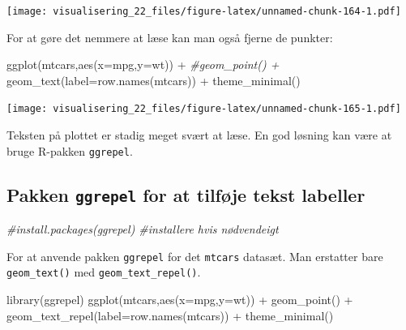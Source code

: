 \documentclass[
]{book}
\newenvironment{Shaded}{\begin{snugshade}}{\end{snugshade}}
\newcommand{\AttributeTok}[1]{\textcolor[rgb]{0.77,0.63,0.00}{#1}}
\newcommand{\CommentTok}[1]{\textcolor[rgb]{0.56,0.35,0.01}{\textit{#1}}}
\newcommand{\FunctionTok}[1]{\textcolor[rgb]{0.00,0.00,0.00}{#1}}
\newcommand{\NormalTok}[1]{#1}
\newcommand{\SpecialCharTok}[1]{\textcolor[rgb]{0.00,0.00,0.00}{#1}}
\begin{document}
\texttt{[image: visualisering\_22\_files/figure-latex/unnamed-chunk-164-1.pdf]}

For at gøre det nemmere at læse kan man også fjerne de punkter:

\begin{Shaded}
\begin{Highlighting}[]
\FunctionTok{ggplot}\NormalTok{(mtcars,}\FunctionTok{aes}\NormalTok{(}\AttributeTok{x=}\NormalTok{mpg,}\AttributeTok{y=}\NormalTok{wt)) }\SpecialCharTok{+} 
  \CommentTok{\#geom\_point() +}
  \FunctionTok{geom\_text}\NormalTok{(}\AttributeTok{label=}\FunctionTok{row.names}\NormalTok{(mtcars)) }\SpecialCharTok{+} 
  \FunctionTok{theme\_minimal}\NormalTok{()}
\end{Highlighting}
\end{Shaded}

\texttt{[image: visualisering\_22\_files/figure-latex/unnamed-chunk-165-1.pdf]}

Teksten på plottet er stadig meget svært at læse. En god løsning kan være at bruge R-pakken \texttt{ggrepel}.

\hypertarget{pakken-ggrepel-for-at-tilfuxf8je-tekst-labeller}{%
\subsection{\texorpdfstring{Pakken \texttt{ggrepel} for at tilføje tekst labeller}{Pakken ggrepel for at tilføje tekst labeller}}\label{pakken-ggrepel-for-at-tilfuxf8je-tekst-labeller}}

\begin{Shaded}
\begin{Highlighting}[]
\CommentTok{\#install.packages(ggrepel) \#installere hvis nødvendeigt}
\end{Highlighting}
\end{Shaded}

For at anvende pakken \texttt{ggrepel} for det \texttt{mtcars} datasæt. Man erstatter bare \texttt{geom\_text()} med \texttt{geom\_text\_repel()}.

\begin{Shaded}
\begin{Highlighting}[]
\FunctionTok{library}\NormalTok{(ggrepel)}
\FunctionTok{ggplot}\NormalTok{(mtcars,}\FunctionTok{aes}\NormalTok{(}\AttributeTok{x=}\NormalTok{mpg,}\AttributeTok{y=}\NormalTok{wt)) }\SpecialCharTok{+} 
  \FunctionTok{geom\_point}\NormalTok{() }\SpecialCharTok{+}
  \FunctionTok{geom\_text\_repel}\NormalTok{(}\AttributeTok{label=}\FunctionTok{row.names}\NormalTok{(mtcars)) }\SpecialCharTok{+} 
  \FunctionTok{theme\_minimal}\NormalTok{()}
\end{Highlighting}
\end{Shaded}
\end{document}

